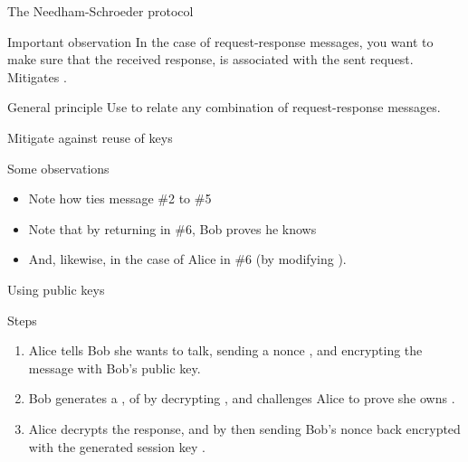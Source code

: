   \begin{slide}{The Needham-Schroeder protocol}
    \begin{centerfig}
    \end{centerfig}

    \begin{alertblock}{Important observation}
      In the case of request-response messages, you want to make sure that the received response, is
      associated with the sent request. Mitigates .
    \end{alertblock}

    \begin{block}{General principle}
      Use  to relate any combination of request-response messages.
    \end{block}
  \end{slide}
  \begin{slide}{Mitigate against reuse of keys}
    \begin{centerfig}
    \end{centerfig}
    \begin{exampleblock}{Some observations}
      \begin{itemize}
      \item Note how  ties message \#2 to \#5
      \item Note that by returning  in \#6, Bob proves he knows 
      \item And, likewise, in the case of Alice in \#6 (by modifying ).
      \end{itemize}
    \end{exampleblock}
  \end{slide}
\begin{slide}{Using public keys}
  \begin{centerfig}
  \end{centerfig}
  \begin{block}{Steps}
    \begin{enumerate}
    \item Alice tells Bob she wants to talk, sending a nonce , and encrypting the message with Bob's
      public key.
    \item Bob generates a   , 
      of  by decrypting , and challenges Alice to prove she owns .
    \item Alice decrypts the response, and  by then sending Bob's nonce
      back encrypted with the generated session key .
    \end{enumerate}
  \end{block}
\end{slide}

